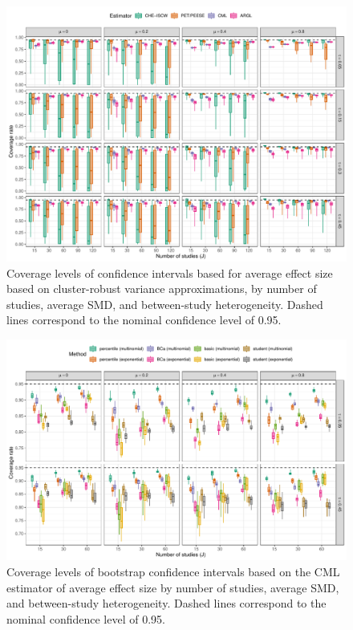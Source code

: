 \documentclass[
  man, donotrepeattitle,floatsintext]{apa7}
\begin{document}
\begin{figure}
\includegraphics{selection_models_draft_files/figure-latex/comparison-coverage-full-1} \caption{Coverage levels of confidence intervals based for average effect size based on cluster-robust variance approximations, by number of studies, average SMD, and between-study heterogeneity. Dashed lines correspond to the nominal confidence level of 0.95.}\label{fig:comparison-coverage-full}
\end{figure}

\begin{figure}
\includegraphics{selection_models_draft_files/figure-latex/CML-coverage-full-1} \caption{Coverage levels of bootstrap confidence intervals based on the CML estimator of average effect size by number of studies, average SMD, and between-study heterogeneity. Dashed lines correspond to the nominal confidence level of 0.95.}\label{fig:CML-coverage-full}
\end{figure}
\end{document}
